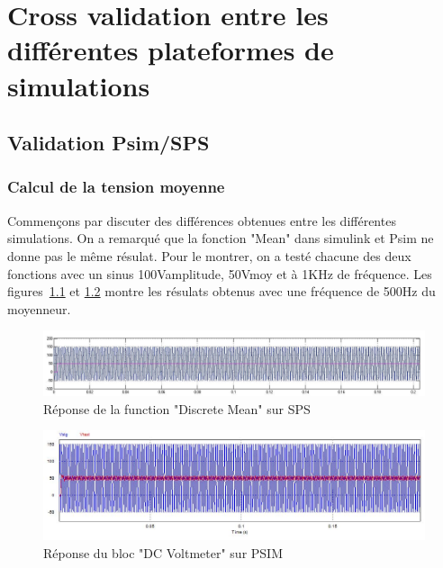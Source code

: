 \documentclass[11pt,letterpaper,final]{report}
\begin{document}
\chapter{Cross validation entre les différentes plateformes de simulations}
\section{Validation Psim/SPS}
\subsection{Calcul de la tension moyenne}

Commençons par discuter des différences obtenues entre les différentes simulations. On a remarqué que la fonction "Mean" dans simulink et Psim ne donne pas le même résulat. Pour le montrer, on a testé chacune des deux fonctions avec un sinus 100Vamplitude, 50Vmoy et à 1KHz de fréquence. Les figures~\ref{dis_mean} et \ref{D_mean} montre les résulats obtenus avec une fréquence de 500Hz du moyenneur.



\begin{figure}[h]
\centering
\includegraphics[scale=0.5]{fig/moy_sim.jpg}
\caption{Réponse de la function "Discrete Mean" sur SPS}
\label{dis_mean}
\end{figure}

\begin{figure}[h]
\centering
\includegraphics[scale=0.5]{fig/moy_psim.jpg}
\caption{Réponse du bloc "DC Voltmeter" sur PSIM}
\label{D_mean}
\end{figure}
\end{document}
